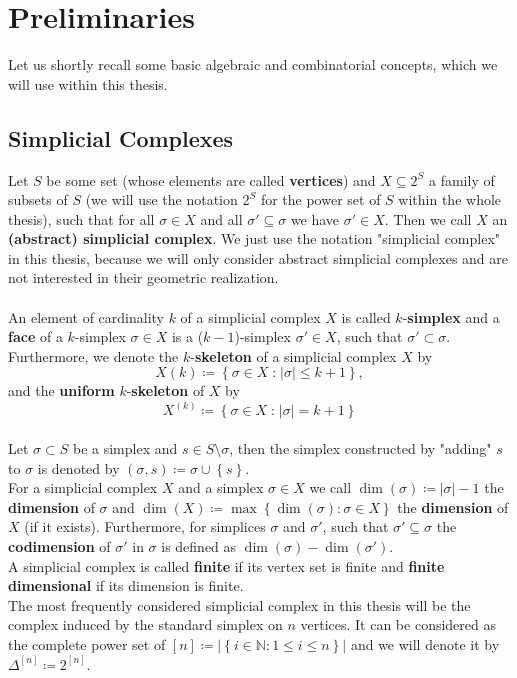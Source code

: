 
\manualmark
{}

\chapter*{Preliminaries}

\label{Preliminaries}

Let us shortly recall some basic algebraic and combinatorial concepts, which we will use within this thesis.

\section*{Simplicial Complexes}

Let \(S\) be some set (whose elements are called \textbf{vertices}) and \(X\subseteq 2^S\) a family of subsets of \(S\) (we will use the notation \(2^S\) for the power set of \(S\) within the whole thesis), such that for all \(\sigma\in X\) and all \(\sigma'\subseteq\sigma\) we have \(\sigma'\in X\). Then we call \(X\) an \textbf{(abstract) simplicial complex}. We just use the notation "simplicial complex" in this thesis, because we will only consider abstract simplicial complexes and are not interested in their geometric realization.\\
\\
An element of cardinality \(k\) of a simplicial complex \(X\) is called \(k\)-\textbf{simplex} and a \textbf{face} of a \(k\)-simplex \(\sigma\in X\) is a (\(k-1\))-simplex \(\sigma'\in X\), such that \(\sigma'\subset\sigma\). Furthermore, we denote the \(k\)-\textbf{skeleton} of a simplicial complex \(X\) by
\[
X(k)\coloneqq \left\{\sigma\in X\;\text{:}\;\left|\sigma\right|\leq k+1\right\},
\]
and the \textbf{uniform} \(k\)-\textbf{skeleton} of \(X\) by
\[
X^{(k)}\coloneqq \left\{\sigma\in X\;\text{:}\;\left|\sigma\right|=k+1\right\}
\]
\\
Let \(\sigma\subset S\) be a simplex and \(s\in S\setminus\sigma\), then the simplex constructed by "adding" \(s\) to \(\sigma\) is denoted by \((\sigma,s)\coloneqq \sigma\cup\left\{s\right\}\).\\
For a simplicial complex \(X\) and a simplex \(\sigma\in X\) we call \(\dim(\sigma)\coloneqq |\sigma|-1\) the \textbf{dimension} of \(\sigma\) and \(\dim(X)\coloneqq \max\left\{\dim(\sigma):\sigma\in X\right\}\) the \textbf{dimension} of \(X\) (if it exists). Furthermore, for simplices \(\sigma\) and \(\sigma'\), such that \(\sigma'\subseteq\sigma\) the \textbf{codimension} of \(\sigma'\) in \(\sigma\) is defined as \(\dim(\sigma)-\dim(\sigma')\). 
\\
A simplicial complex is called \textbf{finite} if its vertex set is finite and \textbf{finite dimensional} if its dimension is finite.\\
The most frequently considered simplicial complex in this thesis will be the complex induced by the standard simplex on \(n\) vertices. It can be considered as the complete power set of \([n]\coloneqq \left|\left\{i\in\mathbb{N}:1\leq i\leq n\right\}\right|\) and we will denote it by \(\Delta^{[n]}\coloneqq 2^{[n]}\).

